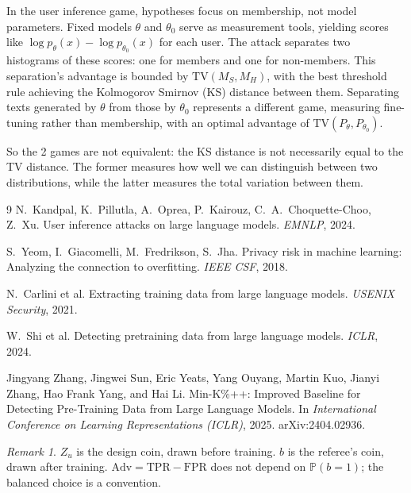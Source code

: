 \documentclass[11pt]{article}
\theoremstyle{remark}
\newtheorem{remark}{Remark}
\newcommand{\Prob}{\mathbb{P}}
\newcommand{\Adv}{\mathrm{Adv}}
\newcommand{\TPR}{\mathrm{TPR}}
\newcommand{\FPR}{\mathrm{FPR}}
\newcommand{\TV}{\mathrm{TV}}
\begin{document}
In the user inference game, hypotheses focus on membership, not model parameters. Fixed models $\theta$ and $\theta_0$ serve as measurement tools, yielding scores like $\log p_\theta(x) - \log p_{\theta_0}(x)$ for each user. The attack separates two histograms of these scores: one for members and one for non-members. This separation's advantage is bounded by $\TV(M_S, M_H)$, with the best threshold rule achieving the Kolmogorov Smirnov (KS) distance between them. Separating texts generated by $\theta$ from those by $\theta_0$ represents a different game, measuring fine-tuning rather than membership, with an optimal advantage of $\TV(P_\theta, P_{\theta_0})$.

So the 2 games are not equivalent: the KS distance is not necessarily equal to the TV distance. The former measures how well we can distinguish between two distributions, while the latter measures the total variation between them.



\newpage
\begin{thebibliography}{9}
N.~Kandpal, K.~Pillutla, A.~Oprea, P.~Kairouz, C.~A.~Choquette-Choo, Z.~Xu.
User inference attacks on large language models. \emph{EMNLP}, 2024.

S.~Yeom, I.~Giacomelli, M.~Fredrikson, S.~Jha.
Privacy risk in machine learning: Analyzing the connection to overfitting. \emph{IEEE CSF}, 2018.

N.~Carlini et al. Extracting training data from large language models. \emph{USENIX Security}, 2021.

W.~Shi et al. Detecting pretraining data from large language models. \emph{ICLR}, 2024.


Jingyang Zhang, Jingwei Sun, Eric Yeats, Yang Ouyang, Martin Kuo, Jianyi Zhang,
Hao Frank Yang, and Hai Li.
\newblock Min-K\%++: Improved Baseline for Detecting Pre-Training Data from Large
  Language Models.
\newblock In \emph{International Conference on Learning Representations (ICLR)}, 2025.
\newblock arXiv:2404.02936.
\end{thebibliography}


\newpage
\appendix

\begin{remark}
$Z_u$ is the design coin, drawn before training. $b$ is the referee's coin, drawn after training.
$\Adv = \TPR - \FPR$ does not depend on $\Prob(b=1)$; the balanced choice is a convention.
\end{remark}
\end{document}
